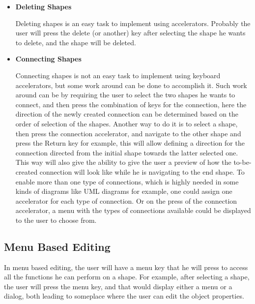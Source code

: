 \begin{itemize}
\item {\bf Deleting Shapes}
\par \noindent
	Deleting shapes is an easy task to implement using accelerators. Probably the user will press the delete (or another) key after selecting the shape he wants to delete, and the shape will be deleted.

\item {\bf Connecting Shapes}
\par \noindent
Connecting shapes is not an easy task to implement using keyboard accelerators, but some work around can be done to accomplish it. Such work around can be by requiring the user to select the two shapes he wants to connect, and then press the combination of keys for the connection, here the direction of the newly created connection can be determined based on the order of selection of the shapes. Another way to do it is to select a shape,  then press the connection accelerator, and navigate to the other shape and press the Return key for example, this will allow defining a direction for the connection directed from the initial shape towards the latter selected one. This way will also give the ability to give the user a preview of how the to-be-created connection will look like while he is navigating to the end shape. To enable more than one type of connections, which is highly needed in some kinds of diagrams like UML diagrams for example, one could assign one accelerator for each type of connection. Or on the press of the connection accelerator, a menu with the types of connections available could be displayed to the user to choose from.

\end{itemize}

\subsection{Menu Based Editing}
In menu based editing, the user will have a menu key that he will press to access all the functions he can perform on a shape. For example, after selecting a shape, the user will press the menu key, and that would display either a menu or a dialog, both leading to someplace where the user can edit the object properties.

